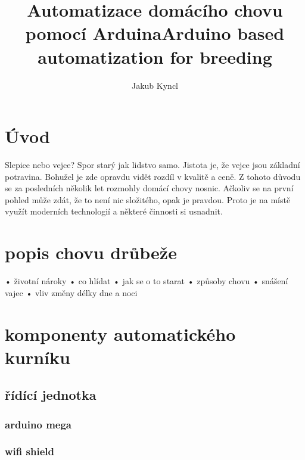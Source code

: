 \documentclass[
program=itp,
  biblatex,
  figures=false,
  glossaries,
  index
]{kidiplom}
\title{Automatizace domácího chovu pomocí Arduina}
\title[english]{Arduino based automatization for breeding}
\author{Jakub Kyncl}
\begin{document}
\maketitle



\newcommand{\BibLaTeX}{\textsc{Bib}\LaTeX}


\section{Úvod}
Slepice nebo vejce? Spor starý jak lidstvo samo. Jistota je, že vejce jsou základní potravina. Bohužel je zde opravdu vidět rozdíl v kvalitě a ceně. Z tohoto důvodu se za posledních několik let rozmohly domácí chovy nosnic. Ačkoliv se na první pohled může zdát, že to není nic složitého, opak je pravdou. Proto je na místě využít moderních technologií a některé činnosti si usnadnit.
\section{popis chovu drůbeže}
•	životní nároky
•	co hlídat
•	jak se o to starat
•	způsoby chovu
•	snášení vajec
•	vliv změny délky dne a noci

\section{komponenty automatického kurníku}

\subsection{řídící jednotka}
\subsubsection{arduino mega}
\subsubsection{wifi shield}
\end{document}
